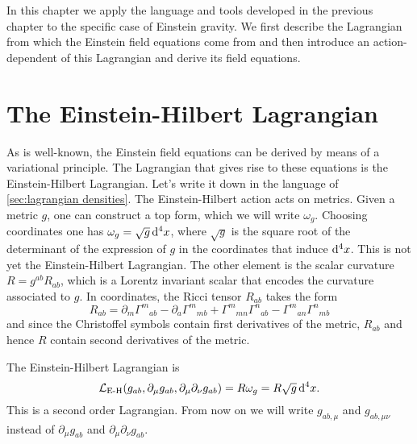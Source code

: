 \documentclass[../main.tex]{subfiles}
\begin{document}
In this chapter we apply the language and tools developed in the previous chapter to the
specific case of Einstein gravity. We first describe the Lagrangian from which the Einstein
field equations come from and then introduce an action-dependent of this Lagrangian and
derive its field equations. 

\section{The Einstein-Hilbert Lagrangian}
As is well-known, the Einstein field equations can be derived by means of a variational
principle. The Lagrangian that gives rise to these equations is the Einstein-Hilbert
Lagrangian. Let's write it down in the language of \cref{sec:lagrangian densities}. The
Einstein-Hilbert action acts on metrics. Given a metric \( g \), one can construct a
top form, which we will write \( \omega_g \). Choosing coordinates one has \( \omega_g =
\sqrt{g} \,\mathrm{d}^4 x \), where \( \sqrt{g} \) is the square root of the determinant of the
expression of \( g \) in the coordinates that induce \( \mathrm{d}^4 x \). This is not yet the
Einstein-Hilbert Lagrangian. The other element is the scalar curvature \( R = g^{ab}R_{ab}
\), which is a Lorentz invariant scalar that encodes the curvature associated to \( g \).
In coordinates, the Ricci tensor \( R_{ab} \) takes the form
\begin{equation} \label{eq:ricci tensor}
	R_{ab} = \partial_m{\Gamma^m}_{ab} - \partial_a {\Gamma^m}_{mb} + {\Gamma^m}_{mn}
	{\Gamma^n}_{ab} - {\Gamma^m}_{an}{\Gamma^n}_{mb}
\end{equation}
and since the Christoffel symbols contain first derivatives of the metric, \( R_{ab} \) and
hence \( R \) contain second derivatives of the metric. 

The Einstein-Hilbert Lagrangian is
\begin{equation}\label{eq:EH lagrangian}
	\mathcal{L}_{\text{E-H}}(g_{ab}, \partial_\mu g_{ab}, \partial_\mu \partial_\nu g_{ab}) =
	R\omega_g = R \sqrt{g}\,\mathrm{d}^4 x.
\end{equation}
This is a second order Lagrangian. From now on we will write \( g_{ab,\mu} \) and \(
g_{ab,\mu\nu} \) instead of \( \partial_\mu g_{ab} \) and \( \partial_\mu\partial_\nu
g_{ab} \). 
\end{document}
